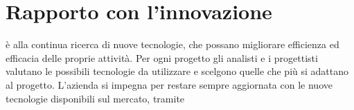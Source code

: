 \section{Rapporto con l'innovazione}
\nomeAzienda{} è alla continua ricerca di nuove tecnologie, che possano migliorare efficienza ed efficacia delle proprie attività. Per ogni progetto gli analisti e i progettisti valutano le possibili tecnologie da utilizzare e scelgono quelle che più si adattano al progetto. L'azienda si impegna per restare sempre aggiornata con le nuove tecnologie disponibili sul mercato, tramite